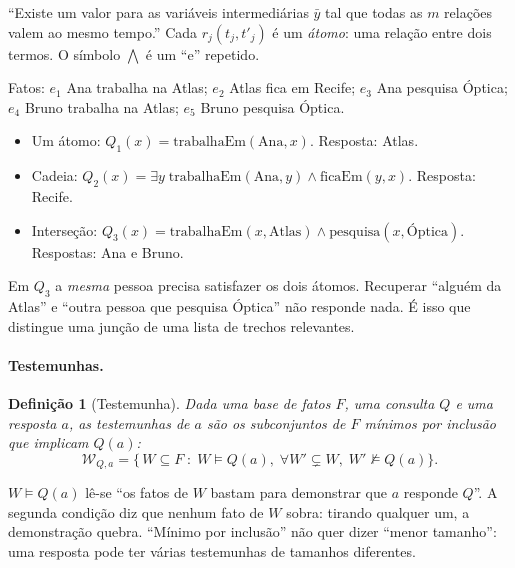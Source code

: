 \documentclass[11pt]{article}
\newtheorem{definicao}{Definição}
\begin{document}
\begin{empalavras}
``Existe um valor para as variáveis intermediárias $\bar y$ tal que todas as
$m$ relações valem ao mesmo tempo.'' Cada $r_j(t_j,t'_j)$ é um \emph{átomo}:
uma relação entre dois termos. O símbolo $\bigwedge$ é um ``e'' repetido.
\end{empalavras}

\begin{exemplo}
Fatos: $e_1$ Ana trabalha na Atlas; $e_2$ Atlas fica em Recife;
$e_3$ Ana pesquisa Óptica; $e_4$ Bruno trabalha na Atlas; $e_5$ Bruno
pesquisa Óptica.
\begin{itemize}[nosep]
\item Um átomo: $Q_1(x)=\mathrm{trabalhaEm}(\text{Ana},x)$. Resposta: Atlas.
\item Cadeia: $Q_2(x)=\exists y\;\mathrm{trabalhaEm}(\text{Ana},y)\wedge\mathrm{ficaEm}(y,x)$. Resposta: Recife.
\item Interseção: $Q_3(x)=\mathrm{trabalhaEm}(x,\text{Atlas})\wedge\mathrm{pesquisa}(x,\text{Óptica})$. Respostas: Ana e Bruno.
\end{itemize}
Em $Q_3$ a \emph{mesma} pessoa precisa satisfazer os dois átomos. Recuperar
``alguém da Atlas'' e ``outra pessoa que pesquisa Óptica'' não responde nada.
É isso que distingue uma junção de uma lista de trechos relevantes.
\end{exemplo}

\paragraph{Testemunhas.}
\begin{definicao}[Testemunha]
Dada uma base de fatos $F$, uma consulta $Q$ e uma resposta $a$, as
testemunhas de $a$ são os subconjuntos de $F$ mínimos por inclusão que
implicam $Q(a)$:
\begin{equation}
  \mathcal{W}_{Q,a}=\bigl\{\,W\subseteq F \;:\; W\models Q(a),\;
  \forall W'\subsetneq W,\;W'\not\models Q(a)\bigr\}.
  \label{eq:testemunha}
\end{equation}
\end{definicao}

\begin{empalavras}
$W\models Q(a)$ lê-se ``os fatos de $W$ bastam para demonstrar que $a$
responde $Q$''. A segunda condição diz que nenhum fato de $W$ sobra: tirando
qualquer um, a demonstração quebra. ``Mínimo por inclusão'' não quer dizer
``menor tamanho'': uma resposta pode ter várias testemunhas de tamanhos
diferentes.
\end{empalavras}
\end{document}
